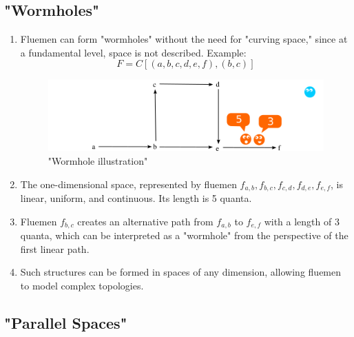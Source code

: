 \documentclass[final]{article}
\begin{document}
        \subsection{"Wormholes"}

            \begin{enumerate}

                \item Fluemen can form "wormholes" without the need for "curving 
                space," since at a fundamental level, space is not described. 
                Example: \[ F = C[(a,b,c,d,e,f),(b,c)] \]

                \begin{figure}[H]
                    \centering
                    \includegraphics[width=\textwidth]{./wormhole.png}
                    \caption{"Wormhole illustration"}
                    \label{fig:image}
                \end{figure}

                \item The one-dimensional space, represented by fluemen 
                \(f_{a,b}, f_{b,c}, f_{c,d}, f_{d,e}, f_{e,f}\), is linear, 
                uniform, and continuous. Its length is 5 quanta.

                \item Fluemen \( f_{b,c} \) creates an alternative path from 
                \(f_{a,b}\) to \(f_{e,f}\) with a length of 3 quanta, which can 
                be interpreted as a "wormhole" from the perspective of the first 
                linear path.

                \item Such structures can be formed in spaces of any dimension, 
                allowing fluemen to model complex topologies.

            \end{enumerate}


        \subsection{"Parallel Spaces"}
\end{document}

